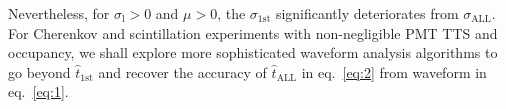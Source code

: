 Nevertheless, for $\sigma_\mathrm{l} > 0$ and $\mu >0$, the $\sigma_{\mathrm{1st}}$ significantly deteriorates from $\sigma_{\mathrm{ALL}}$.  For Cherenkov and scintillation experiments with non-negligible PMT TTS and occupancy, we shall explore more sophisticated waveform analysis algorithms to go beyond $\hat{t}_{\mathrm{1st}}$ and recover the accuracy of $\hat{t}_\mathrm{ALL}$ in eq.~\eqref{eq:2} from waveform in eq.~\eqref{eq:1}.
